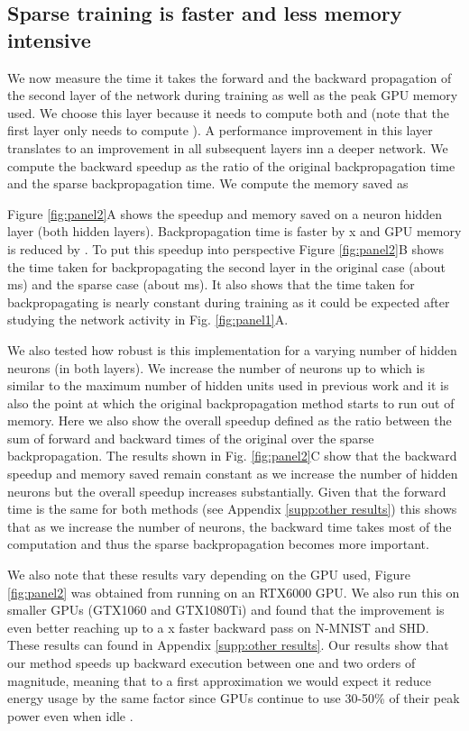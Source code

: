 \documentclass{article}
\begin{document}
\subsection{Sparse training is faster and less memory intensive}

We now measure the time it takes the forward and the backward propagation of the second layer of the network during training as well as the peak GPU memory used. We choose this layer because it needs to compute both   and  (note that the first layer only needs to compute ). A performance improvement in this layer translates to an improvement in all subsequent layers inn a deeper network. We compute the backward speedup as the ratio of the original backpropagation time and the sparse backpropagation time. We compute the memory saved as



Figure \ref{fig:panel2}A shows the speedup and memory saved on a  neuron hidden layer (both hidden layers).
Backpropagation time is faster by x and GPU memory is reduced by .
To put this speedup into perspective Figure \ref{fig:panel2}B shows the time taken for backpropagating the second layer in the original case (about ms) and the sparse case (about ms). It also shows that the time taken for backpropagating is nearly constant during training as it could be expected after studying the network activity in Fig. \ref{fig:panel1}A. 



We also tested how robust is this implementation for a varying number of hidden neurons (in both layers). We increase the number of neurons up to  which is similar to the maximum number of hidden units used in previous work \cite{cramer2020heidelberg} and it is also the point at which the original backpropagation method starts to run out of memory. Here we also show the overall speedup defined as the ratio between the sum of forward and backward times of the original over the sparse backpropagation. The results shown in Fig. \ref{fig:panel2}C show that the backward speedup and memory saved remain constant as we increase the number of hidden neurons but the overall speedup increases substantially. Given that the forward time is the same for both methods (see Appendix \ref{supp:other results}) this shows that as we increase the number of neurons, the backward time takes most of the computation and thus the sparse backpropagation becomes more important.

We also note that these results vary depending on the GPU used, Figure \ref{fig:panel2} was obtained from running on an RTX6000 GPU. We also run this on smaller GPUs (GTX1060 and GTX1080Ti) and found that the improvement is even better reaching up to a x faster backward pass on N-MNIST and SHD. These results can found in Appendix \ref{supp:other results}. Our results show that our method speeds up backward execution between one and two orders of magnitude, meaning that to a first approximation we would expect it reduce energy usage by the same factor since GPUs continue to use 30-50\% of their peak power even when idle \cite{knight2018gpus}.
\end{document}
